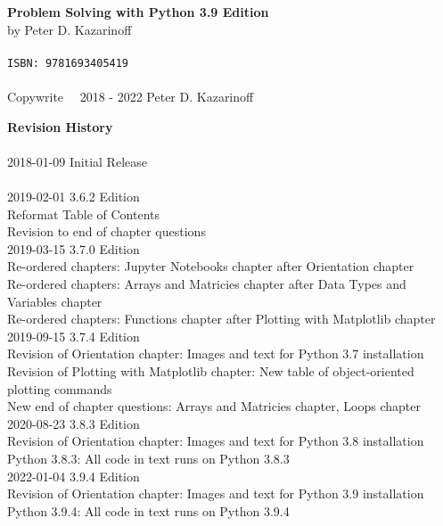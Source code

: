 
\textbf{Problem Solving with Python 3.9 Edition} \\
by Peter D. Kazarinoff \\
\\
\texttt{ISBN: 9781693405419} \\
\\
Copywrite \  \textcopyright \  2018 - 2022 Peter D. Kazarinoff\\

\vspace{2in}

\textbf{Revision History}\\
\\
2018-01-09 Initial Release\\
\\
2019-02-01 3.6.2 Edition\\
Reformat Table of Contents\\
Revision to end of chapter questions\\

2019-03-15 3.7.0 Edition \\
Re-ordered chapters: Jupyter Notebooks chapter after Orientation chapter \\
Re-ordered chapters: Arrays and Matricies chapter after Data Types and Variables chapter \\
Re-ordered chapters: Functions chapter after Plotting with Matplotlib chapter \\

2019-09-15 3.7.4 Edition \\
Revision of Orientation chapter: Images and text for Python 3.7 installation \\
Revision of Plotting with Matplotlib chapter: New table of object-oriented plotting commands \\
New end of chapter questions: Arrays and Matricies chapter, Loops chapter \\

2020-08-23 3.8.3 Edition \\
Revision of Orientation chapter: Images and text for Python 3.8 installation \\
Python 3.8.3: All code in text runs on Python 3.8.3 \\

2022-01-04 3.9.4 Edition \\
Revision of Orientation chapter: Images and text for Python 3.9 installation \\
Python 3.9.4: All code in text runs on Python 3.9.4 \\
